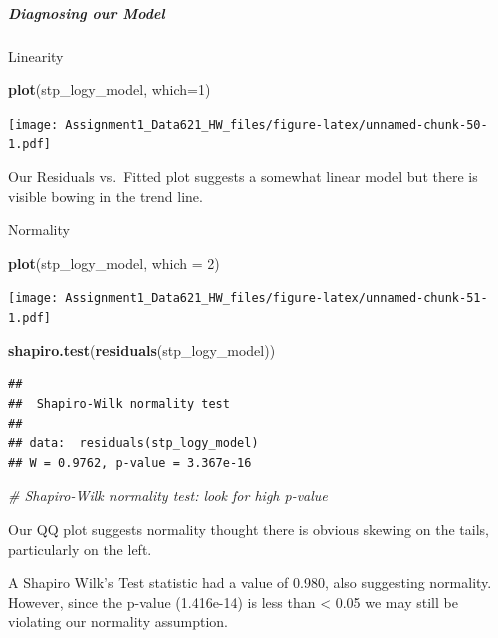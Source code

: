 \documentclass[
]{article}
\newenvironment{Shaded}{\begin{snugshade}}{\end{snugshade}}
\newcommand{\AttributeTok}[1]{\textcolor[rgb]{0.13,0.29,0.53}{#1}}
\newcommand{\CommentTok}[1]{\textcolor[rgb]{0.56,0.35,0.01}{\textit{#1}}}
\newcommand{\DecValTok}[1]{\textcolor[rgb]{0.00,0.00,0.81}{#1}}
\newcommand{\FunctionTok}[1]{\textcolor[rgb]{0.13,0.29,0.53}{\textbf{#1}}}
\newcommand{\NormalTok}[1]{#1}
\begin{document}
\subparagraph{Diagnosing our Model}\label{diagnosing-our-model-2}

Linearity

\begin{Shaded}
\begin{Highlighting}[]
\FunctionTok{plot}\NormalTok{(stp\_logy\_model, }\AttributeTok{which=}\DecValTok{1}\NormalTok{)}
\end{Highlighting}
\end{Shaded}

\texttt{[image: Assignment1\_Data621\_HW\_files/figure-latex/unnamed-chunk-50-1.pdf]}

Our Residuals vs.~Fitted plot suggests a somewhat linear model but there
is visible bowing in the trend line.

Normality

\begin{Shaded}
\begin{Highlighting}[]
\FunctionTok{plot}\NormalTok{(stp\_logy\_model, }\AttributeTok{which =} \DecValTok{2}\NormalTok{)}
\end{Highlighting}
\end{Shaded}

\texttt{[image: Assignment1\_Data621\_HW\_files/figure-latex/unnamed-chunk-51-1.pdf]}

\begin{Shaded}
\begin{Highlighting}[]
\FunctionTok{shapiro.test}\NormalTok{(}\FunctionTok{residuals}\NormalTok{(stp\_logy\_model))}
\end{Highlighting}
\end{Shaded}

\begin{verbatim}
## 
##  Shapiro-Wilk normality test
## 
## data:  residuals(stp_logy_model)
## W = 0.9762, p-value = 3.367e-16
\end{verbatim}

\begin{Shaded}
\begin{Highlighting}[]
\CommentTok{\# Shapiro{-}Wilk normality test: look for high p{-}value}
\end{Highlighting}
\end{Shaded}

Our QQ plot suggests normality thought there is obvious skewing on the
tails, particularly on the left.

A Shapiro Wilk's Test statistic had a value of 0.980, also suggesting
normality. However, since the p-value (1.416e-14) is less than
\textless{} 0.05 we may still be violating our normality assumption.
\end{document}
